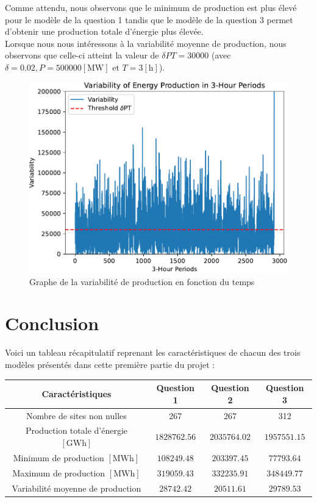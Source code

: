\documentclass{article}
\newlength{\temp}
\begin{document}
Comme attendu, nous observons que le minimum de production est plus élevé pour le modèle de la question 1 tandis que le modèle de la question 3 permet d'obtenir une production totale d'énergie plus élevée.\\
Lorsque nous nous intéressons à la variabilité moyenne de production, nous observons que celle-ci atteint la valeur de $\delta P T = 30 000$ (avec $\delta = 0.02, P = 500 000 [\mathrm{MW}]$ et $T = 3 [\mathrm{h}]$).\\

\begin{figure}[h!]
    \centering
    \includegraphics[scale=0.5]{Images/Partie_1/Q3/variability_comparison.pdf}
    \caption{Graphe de la variabilité de production en fonction du temps}
    \label{fig:variability_comparison_Q3}
\end{figure}

\newpage

\section*{Conclusion}
Voici un tableau récapitulatif reprenant les caractéristiques de chacun des trois modèles présentés dans cette première partie du projet :
\begin{center}
    \begin{tabular}{c| c c c }
        Caractéristiques & Question 1 & Question 2 & Question 3\\
        \hline
        Nombre de sites non nulles & 267 & 267 & 312\\
        Production totale d'énergie $[\mathrm{GWh}]$& $1828762.56$ & $2035764.02$ & $1957551.15$\\
        Minimum de production $[\mathrm{MWh}]$ & $108249.48$ & $203397.45$ & $77793.64$\\
        Maximum de production $[\mathrm{MWh}]$ & $319059.43$ & $332235.91$ & $348449.77$\\
        Variabilité moyenne de production & $28742.42$ & $20511.61$ & $29789.53$\\
        \hline
    \end{tabular}
\end{center}
\end{document}
